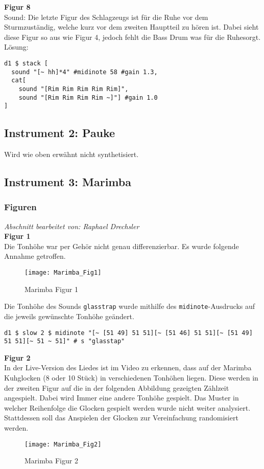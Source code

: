 \documentclass[
10pt, %
a4paper, %
oneside, %
headinclude,footinclude, %
BCOR5mm, %
]{scrartcl}
\begin{document}
\noindent \textbf{Figur 8}\\
Sound: Die letzte Figur des Schlagzeugs ist für \grqq die Ruhe vor dem Sturm\grqq zuständig, welche kurz vor dem zweiten Hauptteil zu hören ist. Dabei sieht diese Figur so aus
wie Figur 4, jedoch fehlt die Bass Drum was für die \grqq Ruhe\grqq sorgt.\\
Lösung:
\begin{lstlisting}
d1 $ stack [
  sound "[~ hh]*4" #midinote 58 #gain 1.3,
  cat[
    sound "[Rim Rim Rim Rim Rim]",
    sound "[Rim Rim Rim Rim ~]"] #gain 1.0
]
\end{lstlisting}

\subsection{Instrument 2: Pauke}
Wird wie oben erwähnt nicht synthetisiert.

\subsection{Instrument 3: Marimba}
\subsubsection{Figuren}
\textit{Abschnitt bearbeitet von: Raphael Drechsler}\\

\noindent \textbf{Figur 1}\\
Die Tonhöhe war per Gehör nicht genau differenzierbar. Es wurde folgende Annahme getroffen.
\begin{figure}[h]
	\centering 
	\texttt{[image: Marimba\_Fig1]} 
	\caption{Marimba Figur 1}
\end{figure}

\noindent Die Tonhöhe des Sounds \verb|glasstrap| wurde mithilfe des \verb|midinote|-Ausdrucks \cite{tid6} auf die jeweils gewünschte Tonhöhe geändert.
\begin{lstlisting}
d1 $ slow 2 $ midinote "[~ [51 49] 51 51][~ [51 46] 51 51][~ [51 49] 51 51][~ 51 ~ 51]" # s "glasstap"
\end{lstlisting}


\noindent \textbf{Figur 2}\\
In der Live-Version des Liedes ist im Video zu erkennen, dass auf der Marimba Kuhglocken (8 oder 10 Stück) in verschiedenen Tonhöhen liegen. Diese werden in der zweiten Figur auf die in der folgenden Abbildung gezeigten Zählzeit angespielt. Dabei wird Immer eine andere Tonhöhe gespielt. Das Muster in welcher Reihenfolge die Glocken gespielt werden wurde nicht weiter analysiert. Stattdessen soll das Anspielen der Glocken zur Vereinfachung randomisiert werden.
\begin{figure}[h]
	\centering 
	\texttt{[image: Marimba\_Fig2]} 
	\caption{Marimba Figur 2}
\end{figure}
\end{document}
